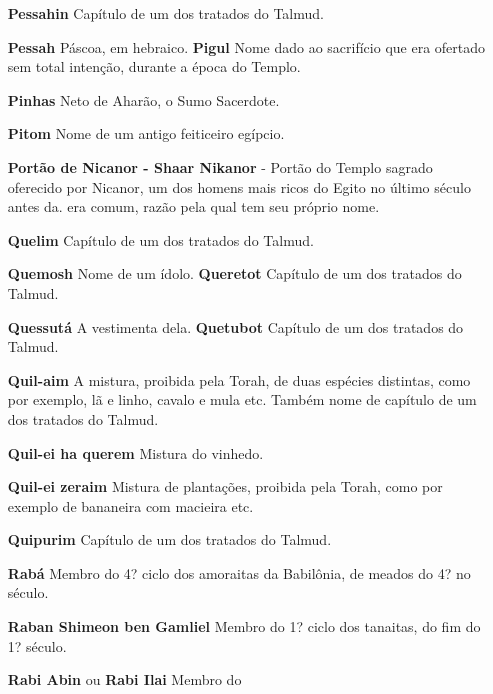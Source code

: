 \begin{itemize}
\begin{enumrate}
\begin{itemize}
\begin{itemize}
\begin{itemize}
\begin{itemize}
\begin{itemize}
\item[\textbf{Pessahin}] Capítulo de um dos trata­dos do Talmud.

\item[\textbf{Pessah} Páscoa, em hebraico. \textbf{Pigul}] Nome dado ao
sacrifício que era ofertado sem total intenção, duran­te a época do
Templo.

\item[\textbf{Pinhas}] Neto de Aharão, o Sumo Sa­cerdote.

\item[\textbf{Pitom}] Nome de um antigo feiticeiro egípcio.

\item[\textbf{Portão de Nicanor - Shaar Nikanor}] - Portão do Templo sagrado
oferecido por Nicanor, um dos homens mais ri­cos do Egito no último
século antes da. era comum, razão pela qual tem seu próprio nome.

\item[\textbf{Quelim}] Capítulo de um dos tratados do Talmud.

\item[\textbf{Quemosh} Nome de um ídolo. \textbf{Queretot}] Capítulo de um
dos trata­dos do Talmud.

\item[\textbf{Quessutá} A vestimenta dela. \textbf{Quetubot}] Capítulo de
um dos trata­dos do Talmud.

\item[\textbf{Quil-aim}] A mistura, proibida pela Torah, de duas espécies
distintas, co­mo por exemplo, lã e linho, cavalo e mula etc. Também nome
de capítulo de um dos tratados do Talmud.

\item[\textbf{Quil-ei ha querem}] Mistura do vinhedo.

\item[\textbf{Quil-ei zeraim}] Mistura de planta­ções, proibida pela Torah,
como por exemplo de bananeira com macieira etc.

\item[\textbf{Quipurim}] Capítulo de um dos trata­dos do Talmud.

\item[\textbf{Rabá}] Membro do 4? ciclo dos amo­raitas da Babilônia, de
meados do 4? no século.

\item[\textbf{Raban Shimeon ben Gamliel}] Mem­bro do 1? ciclo dos tanaitas,
do fim do 1? século.

\item[\textbf{Rabi Abin} ou \textbf{Rabi Ilai}] Membro do


\end{itemize}
\end{itemize}
\end{itemize}
\end{itemize}
\end{itemize}
\end{enumrate}
\end{itemize}
